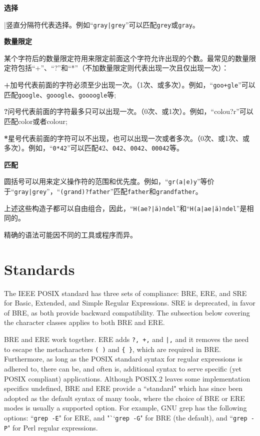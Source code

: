 \begin{compactitem}
\item \textbf{选择}

|竖直分隔符代表选择。例如“\texttt{gray|grey}”可以匹配\texttt{grey}或\texttt{gray}。

\item \textbf{数量限定}

某个字符后的数量限定符用来限定前面这个字符允许出现的个数。最常见的数量限定符包括“+”、“?”和“*”（不加数量限定则代表出现一次且仅出现一次）：

\begin{compactitem}
\item \textbf{+}加号代表前面的字符必须至少出现一次。（1次、或多次）。例如，“\texttt{goo+gle}”可以匹配\texttt{google}、\texttt{gooogle}、\texttt{goooogle}等;
\item \textbf{?}问号代表前面的字符最多只可以出现一次。（0次、或1次）。例如，“colou?r”可以匹配color或者colour;
\item \textbf{*}星号代表前面的字符可以不出现，也可以出现一次或者多次。（0次、或1次、或多次）。例如，“\texttt{0*42}”可以匹配\texttt{4}2、\texttt{042}、\texttt{0042}、\texttt{00042}等。

\end{compactitem}

\item \textbf{匹配}

圆括号可以用来定义操作符的范围和优先度。例如，“\texttt{gr(a|e)y}”等价于“\texttt{gray|grey}”，“\texttt{(grand)?father}”匹配\texttt{father}和\texttt{grandfather}。




\end{compactitem}

上述这些构造子都可以自由组合，因此，“\texttt{H(ae?|ä)ndel}”和“\texttt{H(a|ae|ä)ndel}”是相同的。

精确的语法可能因不同的工具或程序而异。


\section{Standards}

The IEEE POSIX standard has three sets of compliance: BRE, ERE, and SRE for Basic, Extended, and Simple Regular Expressions. SRE is deprecated, in favor of BRE, as both provide backward compatibility. The subsection below covering the character classes applies to both BRE and ERE.

BRE and ERE work together. ERE adds \texttt{?, +,} and \texttt{|,} and it removes the need to escape the metacharacters \texttt{( )} and \texttt{\{ \}}, which are required in BRE. Furthermore, as long as the POSIX standard syntax for regular expressions is adhered to, there can be, and often is, additional syntax to serve specific (yet POSIX compliant) applications. Although POSIX.2 leaves some implementation specifics undefined, BRE and ERE provide a ``standard" which has since been adopted as the default syntax of many tools, where the choice of BRE or ERE modes is usually a supported option. For example, GNU grep has the following options: ``\texttt{grep -E}" for ERE, and "``\texttt{grep -G}" for BRE (the default), and ``\texttt{grep -P}" for Perl regular expressions.

